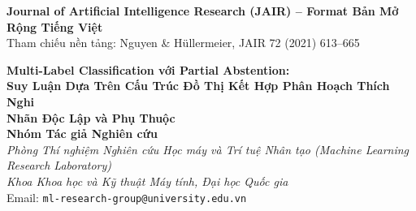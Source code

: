 \documentclass[11pt,a4paper]{article}
\begin{document}
\begin{center}
{\small \textbf{Journal of Artificial Intelligence Research (JAIR) -- Format Bản Mở Rộng Tiếng Việt}}\\[0.1cm]
{\footnotesize Tham chiếu nền tảng: Nguyen \& H\"ullermeier, JAIR 72 (2021) 613--665}
\end{center}
\vspace{0.6cm}

\begin{center}
{\LARGE \textbf{Multi-Label Classification với Partial Abstention:}}\\[0.3cm]
{\Large \textbf{Suy Luận Dựa Trên Cấu Trúc Đồ Thị Kết Hợp Phân Hoạch Thích Nghi\\ Nhãn Độc Lập và Phụ Thuộc}}\\[0.6cm]

{\large \textbf{Nhóm Tác giả Nghiên cứu}}\\[0.2cm]
{\small \textit{Phòng Thí nghiệm Nghiên cứu Học máy và Trí tuệ Nhân tạo (Machine Learning Research Laboratory)}}\\[0.1cm]
{\small \textit{Khoa Khoa học và Kỹ thuật Máy tính, Đại học Quốc gia}}\\[0.1cm]
{\small Email: \texttt{ml-research-group@university.edu.vn}}
\end{center}
\vspace{0.4cm}
\end{document}
